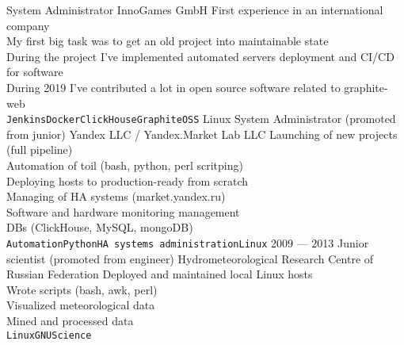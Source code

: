 \documentclass[11pt]{developercv} %
\begin{document}
\begin{entrylist}
    {System Administrator}
    {InnoGames GmbH}
    {
      First experience in an international company\\
      My first big task was to get an old project into maintainable state\\
      During the project I've implemented automated servers deployment and CI/CD for software\\
      During 2019 I've contributed a lot in open source software related to graphite-web\\
      \texttt{Jenkins}\slashsep\texttt{Docker}\slashsep\texttt{ClickHouse}\slashsep\texttt{Graphite}\slashsep\texttt{OSS}
    }
    {Linux System Administrator (promoted from junior)}
    {Yandex LLC / Yandex.Market Lab LLC}
    {
      Launching of new projects (full pipeline)\\
      Automation of toil (bash, python, perl scritping)\\
      Deploying hosts to production-ready from scratch\\
      Managing of HA systems (market.yandex.ru)\\
      Software and hardware monitoring management\\
      DBs (ClickHouse, MySQL, mongoDB)\\
      \texttt{Automation}\slashsep\texttt{Python}\slashsep\texttt{HA systems administration}\slashsep\texttt{Linux}
    }
  \entry
    {2009 --- 2013}
    {Junior scientist (promoted from engineer)}
    {Hydrometeorological Research Centre of Russian Federation}
    {
      Deployed and maintained local Linux hosts\\
      Wrote scripts (bash, awk, perl)\\
      Visualized meteorological data\\
      Mined and processed data\\
      \texttt{Linux}\slashsep\texttt{GNU}\slashsep\texttt{Science}
    }
\end{entrylist}

\end{document}
